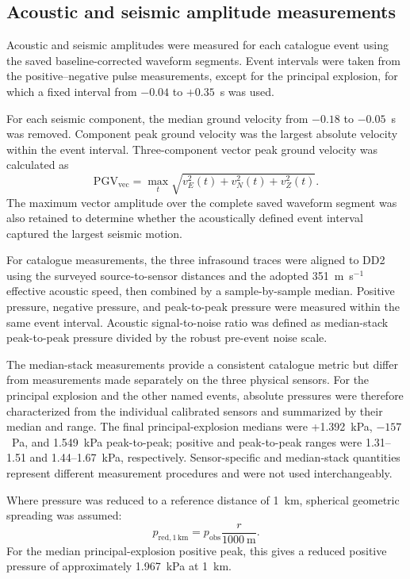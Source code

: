 \documentclass[]{seismica}
\begin{document}
\subsection{Acoustic and seismic amplitude measurements}

Acoustic and seismic amplitudes were measured for each catalogue event using
the saved baseline-corrected waveform segments. Event intervals were taken from
the positive--negative pulse measurements, except for the principal explosion,
for which a fixed interval from $-0.04$ to $+0.35$~s was used.

For each seismic component, the median ground velocity from $-0.18$ to $-0.05$~s was removed. Component peak ground velocity was the largest absolute velocity within the event interval. Three-component vector peak ground velocity was calculated as
\begin{equation}
  \mathrm{PGV}_{\mathrm{vec}} = \max_t\sqrt{v_E^2(t)+v_N^2(t)+v_Z^2(t)}.
  \label{eq:vector_pgv}
\end{equation}
The maximum vector amplitude over the complete saved waveform segment was also retained to determine whether the acoustically defined event interval captured the largest seismic motion.

For catalogue measurements, the three infrasound traces were aligned to DD2
using the surveyed source-to-sensor distances and the adopted
351~m~s$^{-1}$ effective acoustic speed, then combined by a sample-by-sample
median. Positive pressure, negative pressure, and peak-to-peak pressure were
measured within the same event interval. Acoustic signal-to-noise ratio was
defined as median-stack peak-to-peak pressure divided by the robust pre-event
noise scale.

The median-stack measurements provide a consistent catalogue metric but differ
from measurements made separately on the three physical sensors. For the
principal explosion and the other named events, absolute pressures were
therefore characterized from the individual calibrated sensors and summarized
by their median and range. The final principal-explosion medians were
+1.392~kPa, $-157$~Pa, and 1.549~kPa peak-to-peak; positive and peak-to-peak
ranges were 1.31--1.51 and 1.44--1.67~kPa, respectively. Sensor-specific and
median-stack quantities represent different measurement procedures and were
not used interchangeably.

Where pressure was reduced to a reference distance of 1~km, spherical geometric spreading was assumed:
\begin{equation}
  p_{\mathrm{red},1\,\mathrm{km}} = p_{\mathrm{obs}}\frac{r}{1000~\mathrm{m}}.
  \label{eq:reduced_pressure}
\end{equation}
For the median principal-explosion positive peak, this gives a reduced positive
pressure of approximately 1.967~kPa at 1~km.
\end{document}
